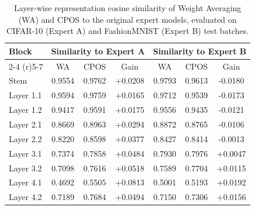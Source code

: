 \documentclass{article}
\theoremstyle{plain}
\theoremstyle{definition}
\theoremstyle{remark}
\begin{document}
\begin{table}[h]
\caption{Layer-wise representation cosine similarity of Weight Averaging (WA) and CPOS to the original expert models, evaluated on CIFAR-10 (Expert A) and FashionMNIST (Expert B) test batches.}
\label{tab:similarity}
\begin{center}
\begin{small}
\begin{sc}
\begin{tabular}{lcccccc}
\toprule
Block & \multicolumn{3}{c}{Similarity to Expert A} & \multicolumn{3}{c}{Similarity to Expert B} \\
\cmidrule(r){2-4} \cmidrule(r){5-7}
& WA & CPOS & Gain & WA & CPOS & Gain \\
\midrule
Stem & 0.9554 & 0.9762 & +0.0208 & 0.9793 & 0.9613 & -0.0180 \\
Layer 1.1 & 0.9594 & 0.9759 & +0.0165 & 0.9712 & 0.9539 & -0.0173 \\
Layer 1.2 & 0.9417 & 0.9591 & +0.0175 & 0.9556 & 0.9435 & -0.0121 \\
Layer 2.1 & 0.8669 & 0.8963 & +0.0294 & 0.8872 & 0.8765 & -0.0106 \\
Layer 2.2 & 0.8220 & 0.8598 & +0.0377 & 0.8427 & 0.8414 & -0.0013 \\
Layer 3.1 & 0.7374 & 0.7858 & +0.0484 & 0.7930 & 0.7976 & +0.0047 \\
Layer 3.2 & 0.7098 & 0.7616 & +0.0518 & 0.7589 & 0.7704 & +0.0115 \\
Layer 4.1 & 0.4692 & 0.5505 & +0.0813 & 0.5001 & 0.5193 & +0.0192 \\
Layer 4.2 & 0.7189 & 0.7684 & +0.0494 & 0.7150 & 0.7306 & +0.0156 \\
\bottomrule
\end{tabular}
\end{sc}
\end{small}
\end{center}
\end{table}
\end{document}
